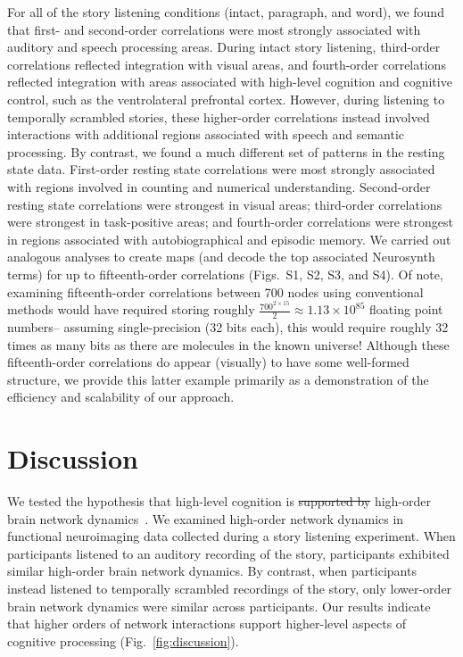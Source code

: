 \documentclass[english]{article}
\newcommand{\intact}{S1}
\newcommand{\para}{S2}
\newcommand{\word}{S3}
\newcommand{\rest}{S4}
\providecommand{\DIFaddtex}[1]{{\protect\color{blue}\uwave{#1}}} %
\providecommand{\DIFdeltex}[1]{{\protect\color{red}\sout{#1}}}                      %
\providecommand{\DIFaddbegin}{} %
\providecommand{\DIFaddend}{} %
\providecommand{\DIFdelbegin}{} %
\providecommand{\DIFdelend}{} %
\providecommand{\DIFadd}[1]{\texorpdfstring{\DIFaddtex{#1}}{#1}} %
\providecommand{\DIFdel}[1]{\texorpdfstring{\DIFdeltex{#1}}{}} %
\newcommand{\DIFscaledelfig}{0.5}
\newlength{\DIFdelgraphicswidth} %
\newlength{\DIFdelgraphicsheight} %
\newcommand{\DIFaddincludegraphics}[2][]{{\color{blue}\fbox{\DIFOincludegraphics[#1]{#2}}}} %
\newcommand{\DIFdelincludegraphics}[2][]{%
\sbox{\DIFdelgraphicsbox}{\DIFOincludegraphics[#1]{#2}}%
\settoboxwidth{\DIFdelgraphicswidth}{\DIFdelgraphicsbox} %
\settoboxtotalheight{\DIFdelgraphicsheight}{\DIFdelgraphicsbox} %
\scalebox{\DIFscaledelfig}{%
\parbox[b]{\DIFdelgraphicswidth}{\usebox{\DIFdelgraphicsbox}\\[-\baselineskip] \rule{\DIFdelgraphicswidth}{0em}}\llap{\resizebox{\DIFdelgraphicswidth}{\DIFdelgraphicsheight}{%
\setlength{\unitlength}{\DIFdelgraphicswidth}%
\begin{picture}(1,1)%
\thicklines\linethickness{2pt} %
{\color[rgb]{1,0,0}\put(0,0){\framebox(1,1){}}}%
{\color[rgb]{1,0,0}\put(0,0){\line( 1,1){1}}}%
{\color[rgb]{1,0,0}\put(0,1){\line(1,-1){1}}}%
\end{picture}%
}\hspace*{3pt}}} %
} %
\DeclareRobustCommand{\DIFaddbegin}{\DIFOaddbegin \let\includegraphics\DIFaddincludegraphics} %
\DeclareRobustCommand{\DIFaddend}{\DIFOaddend \let\includegraphics\DIFOincludegraphics} %
\DeclareRobustCommand{\DIFdelbegin}{\DIFOdelbegin \let\includegraphics\DIFdelincludegraphics} %
\DeclareRobustCommand{\DIFdelend}{\DIFOaddend \let\includegraphics\DIFOincludegraphics} %
\begin{document}
For all of the story listening conditions (intact, paragraph, and
word), we found that first- and second-order correlations were most
strongly associated with auditory and speech processing areas.  During
intact story listening, third-order correlations reflected integration
with visual areas, and fourth-order correlations reflected integration
with areas associated with high-level cognition and cognitive control,
such as the ventrolateral prefrontal cortex.  However, during
listening to temporally scrambled stories, these higher-order
correlations instead involved interactions with additional regions
associated with speech and semantic processing.  By contrast, we found
a much different set of patterns in the resting state data.
First-order resting state correlations were most strongly associated
with regions involved in counting and numerical understanding.
Second-order resting state correlations were strongest in visual
areas; third-order correlations were strongest in task-positive areas;
and fourth-order correlations were strongest in regions associated
with autobiographical and episodic memory.  We carried out analogous
analyses to create maps (and decode the top associated Neurosynth
terms) for up to fifteenth-order correlations (Figs.~\intact, \para, \word, and
\rest).  Of note, examining fifteenth-order correlations between 700
nodes using conventional methods would have required storing roughly
$\frac{700^{2 \times 15}}{2} \approx 1.13 \times 10^{85}$ floating
point numbers-- assuming single-precision (32 bits each), this would
require roughly 32 times as many bits as there are molecules in the
known universe!  Although these fifteenth-order correlations do appear
(visually) to have some well-formed structure, we provide this latter
example primarily as a demonstration of the efficiency and scalability
of our approach.






\section*{Discussion}
We tested the hypothesis that high-level cognition is \DIFdelbegin \DIFdel{supported by
}\DIFdelend \DIFaddbegin \DIFadd{reflected in
}\DIFaddend high-order brain network dynamics~\citep[e.g., see][]{SoloEtal19,
  ReimEtal17}.  We examined high-order network dynamics in functional
neuroimaging data collected during a story listening experiment.  When
participants listened to an auditory recording of the story,
participants exhibited similar high-order brain network dynamics.  By
contrast, when participants instead listened to temporally scrambled
recordings of the story, only lower-order brain network dynamics were
similar across participants.  Our results indicate that higher orders
of network interactions support higher-level aspects of cognitive
processing (Fig.~\ref{fig:discussion}).
\end{document}
